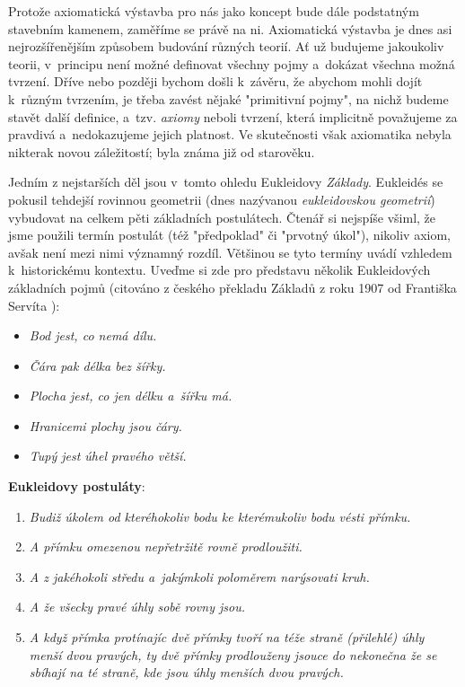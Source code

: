 Protože axiomatická výstavba pro nás jako koncept bude dále podstatným stavebním kamenem, zaměříme se právě na ni. Axiomatická výstavba je dnes asi nejrozšířenějším způsobem budování různých teorií. Ať už budujeme jakoukoliv teorii, v~principu není možné definovat všechny pojmy a~dokázat všechna možná tvrzení. Dříve nebo později bychom došli k~závěru, že abychom mohli dojít k~různým tvrzením, je třeba zavést nějaké "primitivní pojmy", na nichž budeme stavět další definice, a~tzv. \emph{axiomy} neboli tvrzení, která implicitně považujeme za pravdivá a~nedokazujeme jejich platnost. Ve skutečnosti však axiomatika nebyla nikterak novou záležitostí; byla známa již od starověku.\par
Jedním z nejstarších děl jsou v~tomto ohledu Eukleidovy \emph{Základy}. Eukleidés se pokusil tehdejší rovinnou geometrii (dnes nazývanou \emph{eukleidovskou geometrií}) vybudovat na celkem pěti základních postulátech. Čtenář si nejspíše všiml, že jsme použili termín postulát (též "předpoklad" či "prvotný úkol"), nikoliv axiom, avšak není mezi nimi významný rozdíl. Většinou se tyto termíny uvádí vzhledem k~historickému kontextu. Uveďme si zde pro představu několik Eukleidových základních pojmů (citováno z českého překladu Základů z roku 1907 od Františka Servíta \cite{Eukleides1907}):
\begin{itemize}
\item \textit{Bod jest, co nemá dílu.}
\item \textit{Čára pak délka bez šířky.}
\item \textit{Plocha jest, co jen délku a~šířku má.}
\item \textit{Hranicemi plochy jsou čáry.}
\item \textit{Tupý jest úhel pravého větší.}
\end{itemize}
\noindent \textbf{Eukleidovy postuláty}:
\begin{enumerate}[label=({E}\arabic*)]
\item \textit{Budiž úkolem od kteréhokoliv bodu ke kterémukoliv bodu vésti přímku.}
\item \textit{A přímku omezenou nepřetržitě rovně prodloužiti.}
\item \textit{A z jakéhokoli středu a~jakýmkoli poloměrem narýsovati kruh.}
\item \textit{A že všecky pravé úhly sobě rovny jsou.}
\item \textit{A když přímka protínajíc dvě přímky tvoří na téže straně (přilehlé) úhly menší dvou pravých, ty dvě přímky prodlouženy jsouce do nekonečna že se sbíhají na té straně, kde jsou úhly menších dvou pravých.}
\end{enumerate}
